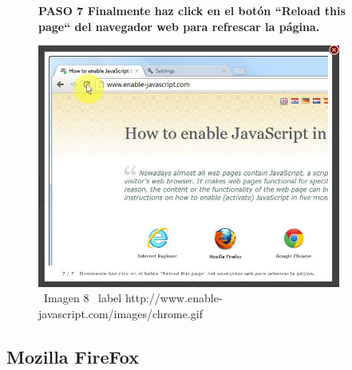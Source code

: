 \documentclass[11pt]{article} %
\begin{document}
\begin{figure}
\begin{center}
\begin{center}
\bf PASO 7
Finalmente haz click en el botón ``Reload this page`` del navegador web para refrescar la página.
\newline
\end{center}

\includegraphics[height=8cm, width=8 cm] {imagenes/chrome 07.jpg}
\newline
\ Imagen 8
\ label { http://www.enable-javascript.com/images/chrome.gif }
\end{center}
\end{figure}


\newpage

\subsection{Mozilla FireFox}
\end{document}
